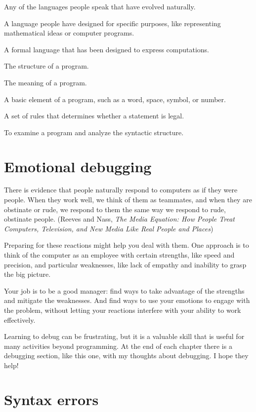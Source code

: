 Any of the languages people speak that have evolved naturally.

A language people have designed for specific purposes, like representing mathematical ideas or computer programs.

A formal language that has been designed to express computations.

The structure of a program.

The meaning of a program.

A basic element of a program, such as a word, space, symbol, or number.

A set of rules that determines whether a statement is legal.

To examine a program and analyze the syntactic structure.


\section{Emotional debugging}


There is evidence that people naturally respond to computers as if they were people.
When they work well, we think of them as teammates, and when they are obstinate or rude, we respond to them the same way we respond to rude, obstinate people.
(Reeves and Nass, {\it The Media Equation: How People Treat Computers, Television, and New Media Like Real People and Places})

Preparing for these reactions might help you deal with them.
One approach is to think of the computer as an employee with certain strengths, like speed and precision, and particular weaknesses, like lack of empathy and inability to grasp the big picture.

Your job is to be a good manager: find ways to take advantage of the strengths and mitigate the weaknesses.
And find ways to use your emotions to engage with the problem, without letting your reactions interfere with your ability to work effectively.

Learning to debug can be frustrating, but it is a valuable skill that is useful for many activities beyond programming.
At the end of each chapter there is a debugging section, like this one, with my thoughts about debugging.
I hope they help!


\section{Syntax errors}

